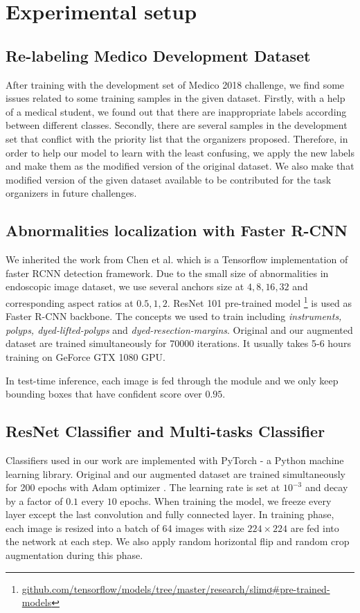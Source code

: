 \section{Experimental setup} 
\label{sec:endscopy_setup}
\subsection{Re-labeling Medico Development Dataset}
After training with the development set of Medico 2018 challenge, we find some issues related to some training samples in the given dataset. Firstly, with a help of a medical student, we found out that there are inappropriate labels according between different classes. Secondly, there are several samples in the development set that conflict with the priority list that the organizers proposed. Therefore, in order to help our model to learn with the least confusing, we apply the new labels and make them as the modified version of the original dataset. We also make that modified version of the given dataset available to be contributed for the task organizers in future challenges. 

\subsection{Abnormalities localization with Faster R-CNN}
We inherited the work from Chen et al. \cite{chen17implementation} which is a Tensorflow implementation of faster RCNN detection framework. Due to the small size of abnormalities in endoscopic image dataset, we use several anchors size at $4,8,16,32$ and corresponding aspect ratios at $0.5,1,2$. ResNet 101 pre-trained model \footnote{\url{github.com/tensorflow/models/tree/master/research/slimơ\#pre-trained-models}} is used as Faster R-CNN backbone. The concepts we used to train including \textit{instruments, polyps, dyed-lifted-polyps} and \textit{dyed-resection-margins}. Original and our augmented dataset are trained simultaneously for 70000 iterations. It usually takes 5-6 hours training on GeForce GTX 1080 GPU.

In test-time inference, each image is fed through the module and we only keep bounding boxes that have confident score over $0.95$.

\subsection{ResNet Classifier and Multi-tasks Classifier}
Classifiers used in our work are implemented with PyTorch - a Python machine learning library. Original and our augmented dataset are trained simultaneously for 200 epochs with Adam optimizer \cite{DBLP:journals/corr/KingmaB14}. The learning rate is set at $10^{-3}$ and decay by a factor of $0.1$ every $10$ epochs. When training the model, we freeze every layer except the last convolution and fully connected layer. In training phase, each image is resized into a batch of 64 images with size $224\times224$ are fed into the network at each step. We also apply random horizontal flip and random crop augmentation during this phase. 
